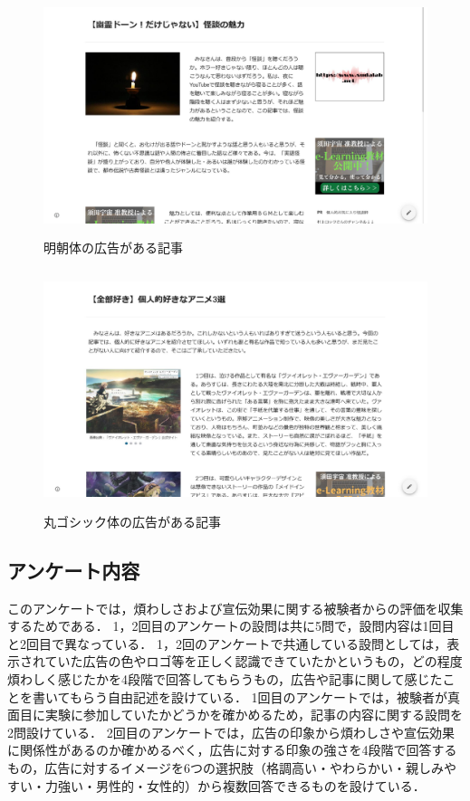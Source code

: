 \documentclass[12pt,a4j,titlepage]{ltjsarticle}
\begin{document}
\begin{figure}[H]
\begin{center}
 \includegraphics[height=70mm]{figures/明朝体.pdf}
\end{center}
 \caption{明朝体の広告がある記事}
 \label{fig:明朝体}
\end{figure}

\begin{figure}[H]
\begin{center}
 \includegraphics[height=70mm]{figures/丸ゴシック体.pdf}
\end{center}
 \caption{丸ゴシック体の広告がある記事}
 \label{fig:丸ゴシック体}
\end{figure}

\subsection{アンケート内容}
このアンケートでは，煩わしさおよび宣伝効果に関する被験者からの評価を収集するためである．
1，2回目のアンケートの設問は共に5問で，設問内容は1回目と2回目で異なっている．
1，2回のアンケートで共通している設問としては，表示されていた広告の色やロゴ等を正しく認識できていたかというもの，どの程度煩わしく感じたかを4段階で回答してもらうもの，広告や記事に関して感じたことを書いてもらう自由記述を設けている．
1回目のアンケートでは，被験者が真面目に実験に参加していたかどうかを確かめるため，記事の内容に関する設問を2問設けている．
2回目のアンケートでは，広告の印象から煩わしさや宣伝効果に関係性があるのか確かめるべく，広告に対する印象の強さを4段階で回答するもの，広告に対するイメージを6つの選択肢（格調高い・やわらかい・親しみやすい・力強い・男性的・女性的）から複数回答できるものを設けている．
\end{document}
